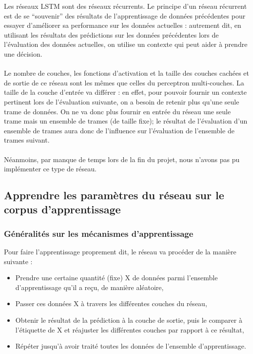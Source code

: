 \documentclass{article}
\begin{document}
Les réseaux LSTM sont des réseaux récurrents. Le principe d'un réseau récurrent est de se ``souvenir'' des résultats de l'apprentissage de données précédentes pour essayer d'améliorer sa performance sur les données actuelles : autrement dit, en utilisant les résultats des prédictions sur les données précédentes lors de l'évaluation des données actuelles, on utilise un contexte qui peut aider à prendre une décision.\\
 \\
Le nombre de couches, les fonctions d'activation et la taille des couches cachées et de sortie de ce réseau sont les mêmes que celles du perceptron multi-couches. La taille de la couche d'entrée va différer : en effet, pour pouvoir fournir un contexte pertinent lors de l'évaluation suivante, on a besoin de retenir plus qu'une seule trame de données. On ne va donc plus fournir en entrée du réseau une seule trame mais un ensemble de trames (de taille fixe); le résultat de l'évaluation d'un ensemble de trames aura donc de l'influence sur l'évaluation de l'ensemble de trames suivant.\\
 \\
Néanmoins, par manque de temps lors de la fin du projet, nous n'avons pas pu implémenter ce type de réseau.

\subsection{Apprendre les paramètres du réseau sur le corpus d'apprentissage}

\subsubsection{Généralités sur les mécanismes d'apprentissage}

Pour faire l'apprentissage proprement dit, le réseau va procéder de la manière suivante :
\begin{itemize}
  \item Prendre une certaine quantité (fixe) X de données parmi l'ensemble d'apprentissage qu'il a reçu, de manière aléatoire,
  \item Passer ces données X à travers les différentes couches du réseau,
  \item Obtenir le résultat de la prédiction à la couche de sortie, puis le comparer à l'étiquette de X et réajuster les différentes couches par rapport à ce résultat,
  \item Répéter jusqu'à avoir traité toutes les données de l'ensemble d'apprentissage.
\end{itemize}
\end{document}
